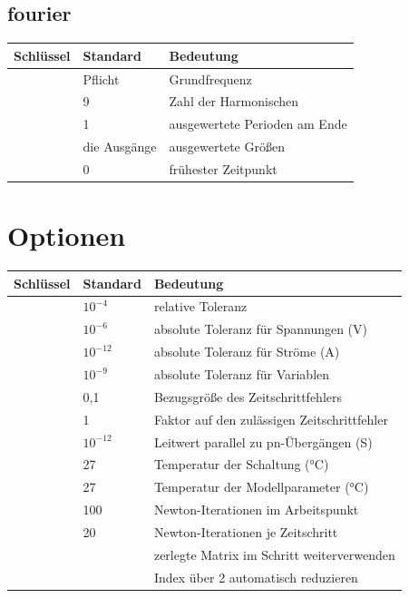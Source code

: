 \subsection*{fourier}
\label{sec:ref-fourier}

\begin{longtable}{@{}P{3.0cm}P{3.4cm}P{7.4cm}@{}}
  \toprule
  Schlüssel & Standard & Bedeutung \\
  \midrule
  \endhead
  \bottomrule
  \endfoot
   & Pflicht & Grundfrequenz \\
   & 9 & Zahl der Harmonischen \\
   & 1 & ausgewertete Perioden am Ende \\
   & die Ausgänge & ausgewertete Größen \\
   & 0 & frühester Zeitpunkt \\
\end{longtable}

\section{Optionen}
\label{sec:ref-optionen}

\begin{longtable}{@{}P{3.4cm}P{2.6cm}P{7.8cm}@{}}
  \toprule
  Schlüssel & Standard & Bedeutung \\
  \midrule
  \endhead
  \bottomrule
  \endfoot
   & $10^{-4}$ & relative Toleranz \\
   & $10^{-6}$ & absolute Toleranz für Spannungen (V) \\
   & $10^{-12}$ & absolute Toleranz für Ströme (A) \\
   & $10^{-9}$ & absolute Toleranz für Variablen \\
   & 0,1 & Bezugsgröße des Zeitschrittfehlers \\
   & 1 & Faktor auf den zulässigen Zeitschrittfehler \\
   & $10^{-12}$ & Leitwert parallel zu pn-Übergängen (S) \\
   & 27 & Temperatur der Schaltung (°C) \\
   & 27 & Temperatur der Modellparameter (°C) \\
   & 100 & Newton-Iterationen im Arbeitspunkt \\
   & 20 & Newton-Iterationen je Zeitschritt \\
   &  & zerlegte Matrix im Schritt weiterverwenden \\
   &  & Index über 2 automatisch reduzieren \\
\end{longtable}

